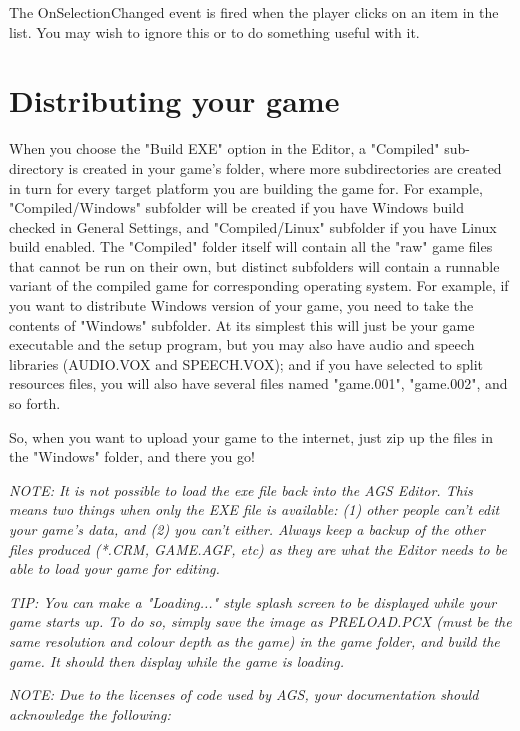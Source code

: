 The OnSelectionChanged event is fired when the player clicks on an item in the list.
You may wish to ignore this or to do something useful with it.

\section{Distributing your game}\label{DistGame}%

When you choose the "Build EXE" option in the Editor, a "Compiled" sub-directory
is created in your game's folder, where more subdirectories are created in turn
for every target platform you are building the game for. For example, "Compiled/Windows"
subfolder will be created if you have Windows build checked in General Settings, and
"Compiled/Linux" subfolder if you have Linux build enabled.
The "Compiled" folder itself will contain all the "raw" game files that cannot be
run on their own, but distinct subfolders will contain a runnable variant of the compiled
game for corresponding operating system.
For example, if you want to distribute Windows version of your game, you need to
take the contents of "Windows" subfolder.
At its simplest this will just be your game executable and the setup
program, but you may also have audio and speech libraries (AUDIO.VOX and
SPEECH.VOX); and if you have selected to split resources files, you will also
have several files named "game.001", "game.002", and so forth.

So, when you want to upload your game to the internet, just zip up the files in
the "Windows" folder, and there you go!

\it{NOTE: It is not possible to load the exe file back into the AGS Editor. This
means two things when only the EXE file is available: (1) other people can't
edit your game's data, and (2) you can't either. Always keep a backup of the
other files produced (*.CRM, GAME.AGF, etc) as they are what the Editor
needs to be able to load your game for editing.}

\it{TIP:} You can make a "Loading..." style splash screen to be displayed while your game starts
up. To do so, simply save the image as  PRELOAD.PCX (must be the same resolution and colour depth
as the game) in the game folder, and build the game. It should then display while the game is loading.

\it{NOTE: Due to the licenses of code used by AGS, your documentation should acknowledge the
following:}


